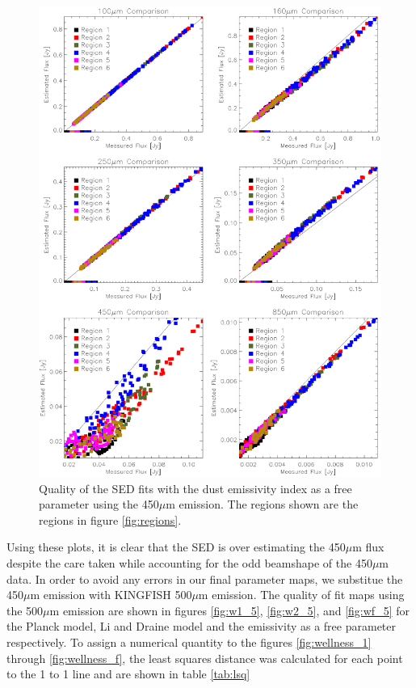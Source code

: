 \begin{figure}
  \centering
  \includegraphics[width=1.\textwidth]{sed_imgs/flux_compare_free_4.eps}
  \caption[Emissivity as a Free Parameter SED Fit Quality Using 450$\mu$m Data]{Quality of the SED fits with the dust emissivity index as a free parameter using the 450$\mu$m emission.  The regions shown are the regions in figure \ref{fig:regions}.}
  \label{fig:wf_4}
\end{figure}

Using these plots, it is clear that the SED is over estimating the 450$\mu$m flux despite the care taken while accounting for the odd beamshape of the 450$\mu$m data.  In order to avoid any errors in our final parameter maps, we substitue the 450$\mu$m emission with KINGFISH 500$\mu$m emission.  The quality of fit maps using the 500$\mu$m emission are shown in figures \ref{fig:w1_5}, \ref{fig:w2_5}, and \ref{fig:wf_5} for the Planck model, Li and Draine model and the emissivity as a free parameter respectively.  To assign a numerical quantity to the figures \ref{fig:wellness_1} through \ref{fig:wellness_f}, the least squares distance was calculated for each point to the 1 to 1 line and are shown in table \ref{tab:lsq}

